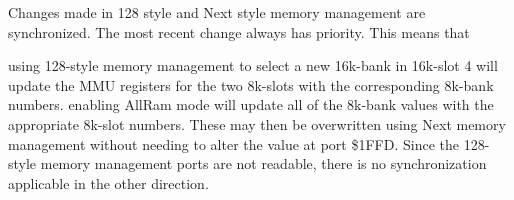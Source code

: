 Changes made in 128 style and Next style memory management are
synchronized. The most recent change always has priority. This means
that

using 128-style memory management to select a new 16k-bank in 16k-slot
4 will update the MMU registers for the two 8k-slots with the
corresponding 8k-bank numbers.  enabling AllRam mode will update all
of the 8k-bank values with the appropriate 8k-slot numbers. These may
then be overwritten using Next memory management without needing to
alter the value at port \$1FFD.  Since the 128-style memory management
ports are not readable, there is no synchronization applicable in the
other direction.
